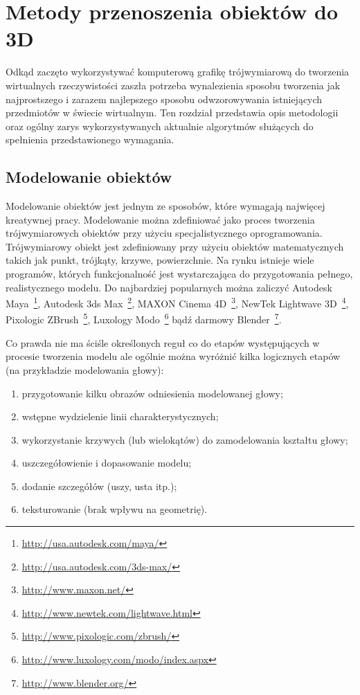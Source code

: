 \section{Metody przenoszenia obiektów do 3D}
Odkąd zaczęto wykorzystywać komputerową grafikę trójwymiarową do tworzenia
wirtualnych rzeczywistości zaszła potrzeba wynalezienia sposobu tworzenia jak
najprostszego i zarazem najlepszego sposobu odwzorowywania istniejących
przedmiotów w świecie wirtualnym. Ten rozdział przedstawia opis metodologii oraz
ogólny zarys wykorzystywanych aktualnie algorytmów służących do spełnienia
przedstawionego wymagania.

\subsection{Modelowanie obiektów}
Modelowanie obiektów jest jednym ze sposobów, które wymagają najwięcej
kreatywnej pracy. Modelowanie można zdefiniować jako proces tworzenia
trójwymiarowych obiektów przy użyciu specjalistycznego oprogramowania.
Trójwymiarowy obiekt jest zdefiniowany przy użyciu obiektów matematycznych
takich jak punkt, trójkąty, krzywe, powierzchnie. Na rynku istnieje wiele programów,
których funkcjonalność jest wystarczająca do przygotowania pełnego,
realistycznego modelu. Do najbardziej popularnych można zaliczyć Autodesk
Maya~\footnote{\url{http://usa.autodesk.com/maya/}}, Autodesk 3ds
Max~\footnote{\url{http://usa.autodesk.com/3ds-max/}}, MAXON Cinema
4D~\footnote{\url{http://www.maxon.net/}}, NewTek Lightwave
3D~\footnote{\url{http://www.newtek.com/lightwave.html}}, Pixologic
ZBrush~\footnote{\url{http://www.pixologic.com/zbrush/}}, Luxology
Modo~\footnote{\url{http://www.luxology.com/modo/index.aspx}} bądź darmowy
Blender~\footnote{\url{http://www.blender.org/}}.

Co prawda nie ma ściśle określonych reguł co do etapów występujących w procesie
tworzenia modelu ale ogólnie można wyróżnić kilka logicznych etapów (na
przykładzie modelowania głowy):
\begin{enumerate}
  \item przygotowanie kilku obrazów odniesienia modelowanej głowy;
  \item wstępne wydzielenie linii charakterystycznych;
  \item wykorzystanie krzywych (lub wielokątów) do zamodelowania kształtu głowy;
  \item uszczegółowienie i dopasowanie modelu;
  \item dodanie szczegółów (uszy, usta itp.);
  \item teksturowanie (brak wpływu na geometrię).
\end{enumerate}


